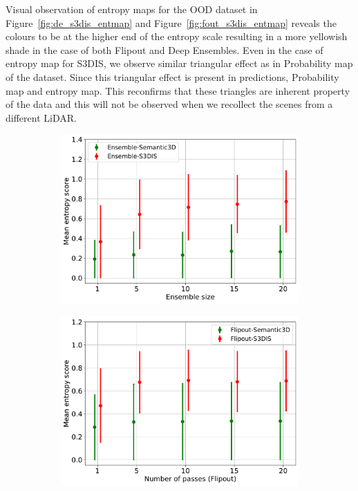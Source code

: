     Visual observation of entropy maps for the OOD dataset in Figure~\ref{fig:de_s3dis_entmap} and Figure~\ref{fig:fout_s3dis_entmap} reveals the colours to be at the higher end of the entropy scale resulting in a more yellowish shade in the case of both Flipout and Deep Ensembles.
    Even in the case of entropy map for S3DIS, we observe similar triangular effect as in Probability map of the dataset.
    Since this triangular effect is present in predictions, Probability map and entropy map.
    This reconfirms that these triangles are inherent property of the data and this will not be observed when we recollect the scenes from a different LiDAR.
    \begin{figure}[!ht]
        \begin{subfigure}{0.98\textwidth}
            \centering
        \includegraphics[scale=0.5]{images/MSP/Ensembles_ENT_semvs3d.pdf}
        \caption{}
        \label{fig:ent_ensembles}
        \end{subfigure}
        \begin{subfigure}{0.98\textwidth}
            \centering
        \includegraphics[scale=0.5]{images/MSP/Flipout_ENT_semvs3d.pdf}

\end{subfigure}
\end{figure}
